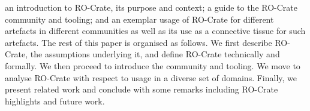 {}\markdownRendererOlBeginTight
{}an introduction to RO-Crate, its purpose and context;\markdownRendererOlItemEnd 
{}a guide to the RO-Crate community and tooling;\markdownRendererOlItemEnd 
{}and an exemplar usage of RO-Crate for different artefacts in different communities as well as its use as a connective tissue for such artefacts.\markdownRendererOlItemEnd 
\markdownRendererOlEndTight \markdownRendererInterblockSeparator
{}The rest of this paper is organised as follows. We first describe RO-Crate, the assumptions underlying it, and define RO-Crate technically and formally. We then proceed to introduce the community and tooling. We move to analyse RO-Crate with respect to usage in a diverse set of domains. Finally, we present related work and conclude with some remarks including RO-Crate highlights and future work. \relax
